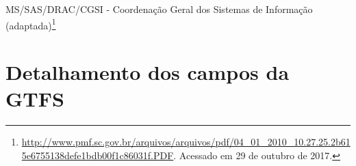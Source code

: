 \documentclass[
	12pt,				%
	oneside,			%
	a4paper,			%
	english,			%
	brazil				%
	]{abntex2ppgsi}
\begin{document}
{{{\begin{apendicesenv}
\begin{longtable}{c|c}
\end{longtable}

 MS/SAS/DRAC/CGSI - Coordenação Geral dos Sistemas de Informação (adaptada)\footnote{\url{http://www.pmf.sc.gov.br/arquivos/arquivos/pdf/04_01_2010_10.27.25.2b615e6755138defe1bdb00f1c86031f.PDF}. Acessado em 29 de outubro de 2017.}

\clearpage


%
%
%
\chapter{Detalhamento dos campos da GTFS}
\label{apendiceC}




\end{apendicesenv}}}}
\end{document}
